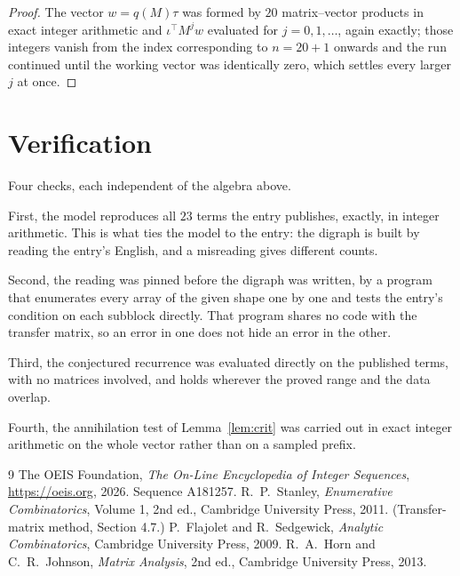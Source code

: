 \documentclass[11pt,a4paper]{article}
\theoremstyle{plain}
\theoremstyle{definition}
\begin{document}
\begin{proof}
The vector $w=q(M)\tau$ was formed by $20$ matrix--vector products in exact integer
arithmetic and $\iota^{\!\top}M^{j}w$ evaluated for $j=0,1,\dots$, again exactly; those
integers vanish from the index corresponding to $n=20+1$ onwards and the run continued
until the working vector was identically zero, which settles every larger $j$ at once.
\end{proof}

\section{Verification}

Four checks, each independent of the algebra above.

First, the model reproduces all $23$ terms the entry publishes, exactly, in integer
arithmetic. This is what ties the model to the entry: the digraph is built by reading the
entry's English, and a misreading gives different counts.

Second, the reading was pinned before the digraph was written, by a program that enumerates
every array of the given shape one by one and tests the entry's condition on each subblock
directly. That program shares no code with the transfer matrix, so an error in one does not
hide an error in the other.

Third, the conjectured recurrence was evaluated directly on the published terms, with no
matrices involved, and holds wherever the proved range and the data overlap.

Fourth, the annihilation test of Lemma~\ref{lem:crit} was carried out in exact integer
arithmetic on the whole vector rather than on a sampled prefix.

\begin{thebibliography}{9}
 The OEIS Foundation, \emph{The On-Line Encyclopedia of Integer
Sequences}, \url{https://oeis.org}, 2026. Sequence A181257.
 R.~P.~Stanley, \emph{Enumerative Combinatorics}, Volume 1, 2nd ed.,
Cambridge University Press, 2011. (Transfer-matrix method, Section 4.7.)
 P.~Flajolet and R.~Sedgewick, \emph{Analytic Combinatorics}, Cambridge
University Press, 2009.
 R.~A.~Horn and C.~R.~Johnson, \emph{Matrix Analysis}, 2nd ed., Cambridge
University Press, 2013.
\end{thebibliography}
\end{document}
